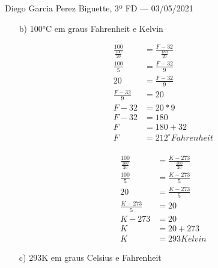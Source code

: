 \documentclass{SchoolBook}
\begin{document}
\begin{day}{Diego Garcia Perez Biguette, 3º FD --- 03/05/2021}
\begin{enumerate}
            \item[b)] 100°C em graus Fahrenheit e Kelvin
            
            \begin{multicols}{2}
                \begin{align*}
                    \frac{100}{\frac{100}{20}} &= \frac{F-32}{\frac{180}{20}} \\
                                 \frac{100}{5} &= \frac{F-32}{9} \\
                                            20 &= \frac{F-32}{9} \\
                                \frac{F-32}{9} &= 20 \\
                                          F-32 &= 20 * 9 \\
                                          F-32 &= 180 \\
                                             F &= 180 + 32 \\
                                             F &= 212^\circ Fahrenheit
                \end{align*} \\
                \begin{align*}
                    \frac{100}{\frac{100}{20}} &= \frac{K-273}{\frac{100}{20}} \\
                                 \frac{100}{5} &= \frac{K-273}{5} \\
                                            20 &= \frac{K-273}{5} \\
                               \frac{K-273}{5} &= 20 \\
                                         K-273 &= 20 \\
                                             K &= 20 + 273 \\
                                             K &= 293 Kelvin
                \end{align*}
            \end{multicols}
            
            \item[c)] 293K  em graus Celsius e Fahrenheit
            

\end{enumerate}
\end{day}
\end{document}
